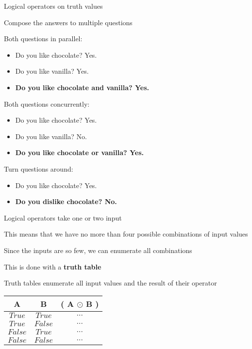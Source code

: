 \documentclass{beamer}
\begin{document}
\begin{slide}{
\item Logical operators on truth values
\item Compose the answers to multiple questions
\item Both questions in parallel:
\begin{itemize}
\item Do you like chocolate? Yes.
\item Do you like vanilla? Yes.
\item \textbf{Do you like chocolate and vanilla? Yes.}
\end{itemize}
\item Both questions concurrently:
\begin{itemize}
\item Do you like chocolate? Yes.
\item Do you like vanilla? No.
\item \textbf{Do you like chocolate or vanilla? Yes.}
\end{itemize}
\item Turn questions around:
\begin{itemize}
\item Do you like chocolate? Yes.
\item \textbf{Do you dislike chocolate? No.}
\end{itemize}
}\end{slide}

\begin{slide}{
\item Logical operators take one or two input
\item This means that we have no more than four possible combinations of input values
\item Since the inputs are so few, we can enumerate all combinations
\item This is done with a \textbf{truth table}
}\end{slide}

\begin{slide}{
\item Truth tables enumerate all input values and the result of their operator
\begin{tabular}{c c c}
A & B & ( A $\odot$ B ) \\
\hline 
$True$ & $True$ &  $\dots$ \\
$True$ & $False$ &  $\dots$ \\
$False$ & $True$ &  $\dots$ \\
$False$ & $False$ &  $\dots$ \\
\end{tabular}
}\end{slide}
\end{document}
